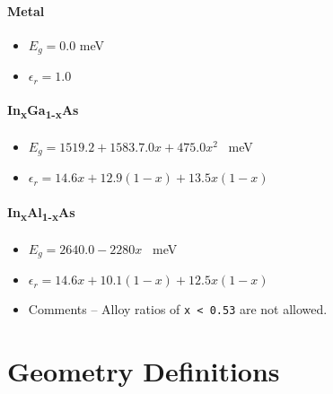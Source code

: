 \documentclass[12pt]{article}
\begin{document}
\paragraph{Metal}
\begin{itemize}
    \item{$E_g = 0.0$ meV}
    \item{$\epsilon_r = 1.0$}
\end{itemize}

\paragraph{In\textsubscript{x}Ga\textsubscript{1-x}As}
\begin{itemize}
    \item{$E_g = 1519.2 + 1583.7.0 x + 475.0 x^2$ \ meV}
    \item{$\epsilon_r = 14.6 x + 12.9 (1-x) + 13.5 x (1-x)$}
\end{itemize}

\paragraph{In\textsubscript{x}Al\textsubscript{1-x}As}
\begin{itemize}
    \item{$E_g = 2640.0 - 2280x$ \ meV}
    \item{$\epsilon_r = 14.6 x + 10.1 (1-x) + 12.5 x (1-x)$}
    \item Comments -- Alloy ratios of \texttt{x < 0.53} are not allowed.
\end{itemize}

\section{Geometry Definitions}
\label{app:GeometryDefinitions}
\end{document}
